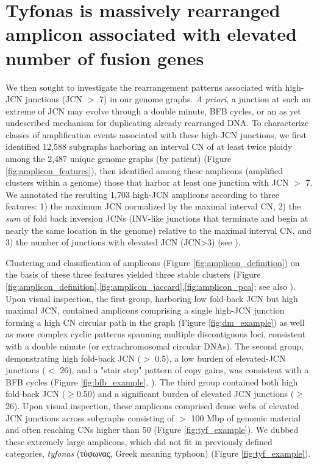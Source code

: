 \documentclass[phd,tocprelim]{cornell}
\begin{document}
\section{Tyfonas is massively rearranged amplicon associated with elevated number of fusion genes}
We then sought to investigate the rearrangement patterns associated with high-JCN junctions (JCN $>$ 7) in our genome graphs.  \textit{A priori}, a junction at such an extreme of JCN may evolve through a double minute, BFB cycles, or an as yet undescribed mechanism for duplicating already rearranged DNA. To characterize classes of  amplification events associated with these high-JCN junctions, we first identified 12,588 subgraphs harboring an interval CN of at least twice ploidy among the 2,487 unique genome graphs (by patient) (Figure \ref{fig:amplicon_features}), then identified among these amplicons (amplified clusters within a genome) those that harbor at least one junction with JCN $>$ 7.  We annotated the resulting 1,703 high-JCN amplicons according to three features: 1) the maximum JCN normalized by the maximal interval CN, 2) the \textit{sum} of fold back inversion JCNs (INV-like junctions that terminate and begin at nearly the same location in the genome) relative to the maximal interval CN, and 3) the number of junctions with elevated JCN (JCN>3) (see ).

Clustering and classification of amplicons (Figure \ref{fig:amplicon_definition}) on the basis of these three features yielded three stable clusters (Figure \ref{fig:amplicon_definition},\ref{fig:amplicon_jaccard},\ref{fig:amplicon_pca}; see also ).  Upon visual inspection, the first group, harboring low fold-back JCN but high maximal JCN, contained amplicons comprising a single high-JCN junction forming a high CN circular path in the graph (Figure \ref{fig:dm_example}) as well as more complex cyclic patterns spanning multiple discontiguous loci, consistent with a double minute (or extrachromosomal circular DNAs).  The second group, demonstrating high fold-back JCN ($>$ 0.5), a low burden of elevated-JCN junctions ($<$ 26), and a "stair step" pattern of copy gains, was consistent with a BFB cycles (Figure \ref{fig:bfb_example}, \cite{Zakov:2013cm,McClintock1939-oi}). The third group contained both high fold-back JCN ($\geq$0.50) and a significant burden of elevated JCN junctions ($\geq$26).  Upon visual inspection, these amplicons comprised dense webs of elevated  JCN junctions across subgraphs consisting of $>$ 100 Mbp of genomic material and often reaching CNs higher than 50 (Figure \ref{fig:tyf_example}).  We dubbed these extremely large amplicons, which did not fit in previously defined categories, \textit{tyfonas} (τύφωνας, Greek meaning typhoon) (Figure \ref{fig:tyf_example}).
\end{document}
